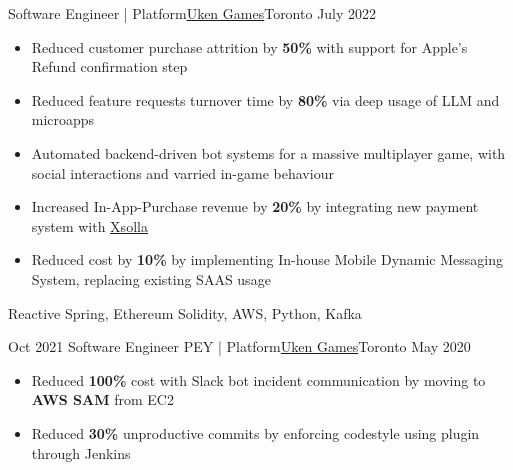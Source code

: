 %
%
%
\begin{experiences}
  \experienceCurrent
    {Software Engineer | Platform}{\href{https://uken.com}{Uken Games}}{Toronto}
    {July 2022} {
                    \begin{itemize}
                        \setlength\itemsep{0.6em}

                        \item Reduced customer purchase attrition by \textbf{50\%} with support for Apple's Refund confirmation step

                        \item Reduced feature requests turnover time by \textbf{80\%} via deep usage of LLM and microapps

                        \item Automated backend-driven bot systems for a massive multiplayer game, with social interactions and varried in-game behaviour

                        \item Increased In-App-Purchase revenue by \textbf{20\%} by integrating new payment system with \href{https://xsolla.com}{Xsolla} 

                        \item Reduced cost by \textbf{10\%} by implementing In-house Mobile Dynamic Messaging System, replacing existing SAAS usage
                    \end{itemize}
                    }
                    {Reactive Spring, Ethereum Solidity, AWS, Python, Kafka}

  \emptySeparator
  \experience
    {Oct 2021}   {Software Engineer PEY | Platform}{\href{https://uken.com}{Uken Games}}{Toronto}
    {May 2020} {
                    \begin{itemize}
                        \setlength\itemsep{0.6em}
                        \item Reduced \textbf{100\%} cost with Slack bot incident communication by moving to \textbf{AWS SAM} from EC2
                        
                        \item Reduced \textbf{30\%} unproductive commits by enforcing codestyle using  plugin through Jenkins


\end{itemize}}
\end{experiences}
